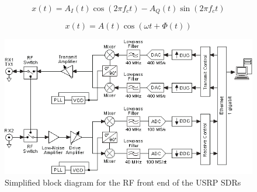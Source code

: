 \begin{equation} \label{eq:complexSampling}
    x\left(t\right) = A_{I}\left(t\right)\cos\left(2\pi f_{c}t\right) - A_{Q}\left(t\right)\sin\left(2\pi f_{c}t\right)
\end{equation}

\begin{equation} \label{eq:realSampling}
    x\left(t\right) = A\left(t\right)\cos\left(\omega t + \Phi \left(t\right)\right)
\end{equation}

\begin{figure}[h]
    \begin{centering}
        \includegraphics[width=13cm,keepaspectratio]{Figures/2920_simplified_system_diagram.png}
        \caption{Simplified block diagram for the RF front end of the USRP SDRs}
    \label{fig:USRPBlock}
    \end{centering}
\end{figure}